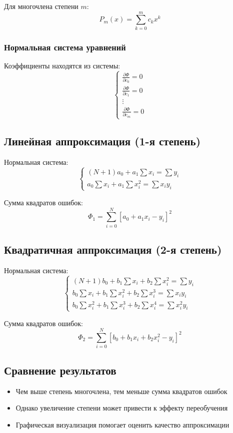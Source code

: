 Для многочлена степени $m$:
\[ P_m(x) = \sum_{k=0}^m c_kx^k \]

\subsubsection*{Нормальная система уравнений}
Коэффициенты находятся из системы:
\[
\begin{cases}
\frac{\partial \Phi}{\partial c_0} = 0 \\
\frac{\partial \Phi}{\partial c_1} = 0 \\
\vdots \\
\frac{\partial \Phi}{\partial c_m} = 0
\end{cases}
\]

\subsection*{Линейная аппроксимация (1-я степень)}

Нормальная система:
\[
\begin{cases}
(N+1)a_0 + a_1\sum x_i = \sum y_i \\
a_0\sum x_i + a_1\sum x_i^2 = \sum x_i y_i
\end{cases}
\]

Сумма квадратов ошибок:
\[ \Phi_1 = \sum_{i=0}^N [a_0 + a_1x_i - y_i]^2 \]

\subsection*{Квадратичная аппроксимация (2-я степень)}

Нормальная система:
\[
\begin{cases}
(N+1)b_0 + b_1\sum x_i + b_2\sum x_i^2 = \sum y_i \\
b_0\sum x_i + b_1\sum x_i^2 + b_2\sum x_i^3 = \sum x_i y_i \\
b_0\sum x_i^2 + b_1\sum x_i^3 + b_2\sum x_i^4 = \sum x_i^2 y_i
\end{cases}
\]

Сумма квадратов ошибок:
\[ \Phi_2 = \sum_{i=0}^N [b_0 + b_1x_i + b_2x_i^2 - y_i]^2 \]

\subsection*{Сравнение результатов}
\begin{itemize}
\item Чем выше степень многочлена, тем меньше сумма квадратов ошибок
\item Однако увеличение степени может привести к эффекту переобучения
\item Графическая визуализация помогает оценить качество аппроксимации
\end{itemize}

